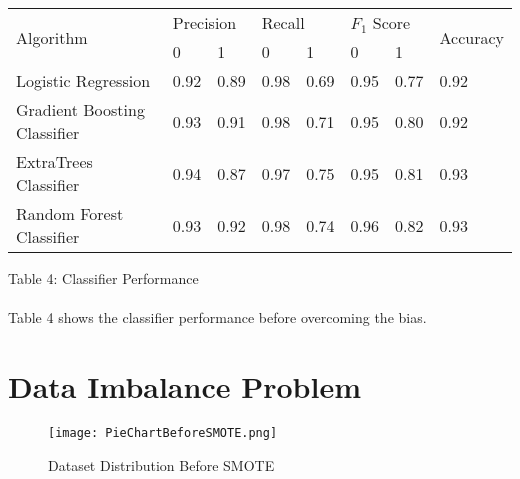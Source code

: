 \documentclass[12pt,letterpaper]{article}
\begin{document}
    \begin{table}[H]
        \begin{center}
            \begin{tabular}{|l|l|l|l|l|l|l|l|}
                \hline
                \multirow{2}{*}{Algorithm} & \multicolumn{2}{l|}{Precision} & \multicolumn{2}{l|}{Recall} & \multicolumn{2}{l|}{$F_1$ Score} & \multirow{2}{*}{Accuracy} \\ \cline{2-7}
                                   & 0              & 1             & 0            & 1            & 0             & 1             &                           \\ \hline
            Logistic Regression         & 0.92           & 0.89          & 0.98         & 0.69         & 0.95          & 0.77          & 0.92                      \\ \hline
            Gradient Boosting Classifier & 0.93           & 0.91          & 0.98         & 0.71         & 0.95          & 0.80          & 0.92                      \\ \hline
            ExtraTrees Classifier       & 0.94           & 0.87          & 0.97         & 0.75         & 0.95          & 0.81          & 0.93                      \\ \hline
            Random Forest Classifier     & 0.93           & 0.92          & 0.98         & 0.74         & 0.96          & 0.82          & 0.93                      \\ \hline
            \end{tabular}
        \end{center}
        \begin{center}
            Table 4: Classifier Performance
        \end{center}
    \end{table}
    
    \paragraph{}
    
        Table 4 shows the classifier performance before overcoming the bias.
    
\section{Data Imbalance Problem}        

    \begin{figure}[H]%
        \begin{center}
          \texttt{[image: PieChartBeforeSMOTE.png]}%
            \caption{Dataset Distribution Before SMOTE}  
        \end{center}
    \end{figure}
    
\end{document}
